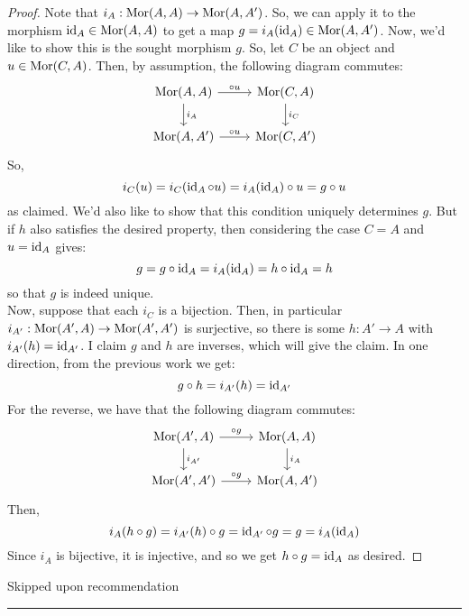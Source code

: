 \documentclass[12pt]{exam}
\begin{document}
\begin{proof}
	Note that $i_A : \operatorname{Mor}(A,A) \to \operatorname{Mor}(A,A')$. So, we can apply it to the morphism $\operatorname{id}_A \in \operatorname{Mor}(A,A)$ to get a map $g = i_A(\operatorname{id}_A) \in \operatorname{Mor}(A,A')$. Now, we'd like to show this is the sought morphism $g$. So, let $C$ be an object and $u \in \operatorname{Mor}(C,A)$. Then, by assumption, the following diagram commutes:
	\[ \begin{tikzcd} \Mor(A,A) \arrow{r}{\circ u} \arrow{d}{i_A} & \Mor(C,A) \arrow{d}{i_C} \\ \Mor(A,A') \arrow{r}{\circ u} & \Mor(C,A') \end{tikzcd} \]
	So,
	\[ i_C(u) = i_C(\operatorname{id}_A \circ u) = i_A(\operatorname{id}_A) \circ u = g \circ u \]
	as claimed. We'd also like to show that this condition uniquely determines $g$. But if $h$ also satisfies the desired property, then considering the case $C = A$ and $u = \operatorname{id}_A$ gives:
	\[ g = g \circ \operatorname{id}_A = i_A(\operatorname{id}_A) = h \circ \operatorname{id}_A = h \]
	so that $g$ is indeed unique. \\
	
	Now, suppose that each $i_C$ is a bijection. Then, in particular $i_{A'} : \operatorname{Mor}(A',A) \to \operatorname{Mor}(A',A')$ is surjective, so there is some $h : A' \to A$ with $i_{A'}(h) = \operatorname{id}_{A'}$. I claim $g$ and $h$ are inverses, which will give the claim. In one direction, from the previous work we get:
	\[ g \circ h = i_{A'}(h) = \operatorname{id}_{A'} \]
	For the reverse, we have that the following diagram commutes:
	\[ \begin{tikzcd} \Mor(A',A) \arrow{r}{\circ g} \arrow{d}{i_{A'}} & \Mor(A,A) \arrow{d}{i_A} \\ \Mor(A',A') \arrow{r}{\circ g} & \Mor(A,A') \end{tikzcd} \]
	Then,
	\[ i_A(h \circ g) = i_{A'}(h) \circ g = \operatorname{id}_{A'} \circ g = g = i_A(\operatorname{id}_A) \]
	Since $i_A$ is bijective, it is injective, and so we get $h \circ g = \operatorname{id}_A$ as desired.
\end{proof}

 Skipped upon recommendation \\

\hrule ${}$ \\
\end{document}
